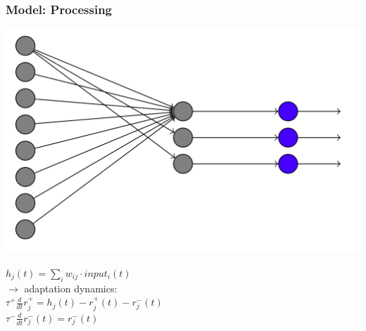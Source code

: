\begin{frame}
\frametitle{Model: Processing}
\begin{multicols}{2}
\begin{center}
\includegraphics[scale=.1]{pics/model_processing}
\end{center}
\columnbreak
\begin{center}
$h_j(t) = \sum_i w_{ij} \cdot input_i(t)$\\
\vskip 6mm
$\rightarrow$ adaptation dynamics:\\
\vskip 3mm
$\tau^+\frac{d}{dt}r^+_j=h_j(t)-r^+_j(t)-r^-_j(t)$\\
\vskip 3mm
$\tau^-\frac{d}{dt}r^-_j(t)=r^-_j(t)$
\vskip 5mm
\end{center}
\end{multicols}
\end{frame}

